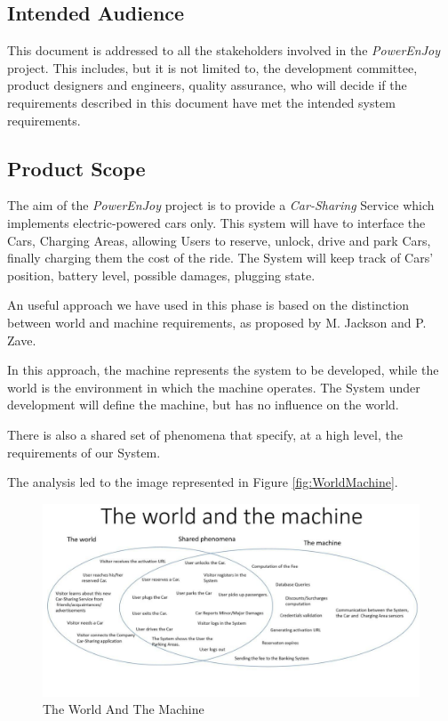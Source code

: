 \subsection{Intended Audience}
This document is addressed to all the stakeholders involved in the \emph{PowerEnJoy} project. This includes, but it is not limited to, the development committee, product designers and engineers, quality assurance, who will decide if the requirements described in this document have met the intended system requirements.

\subsection{Product Scope}
The aim of the \emph{PowerEnJoy} project is to provide a \textit{Car-Sharing} Service which implements electric-powered cars only.
This system will have to interface the Cars, Charging Areas, allowing Users to reserve, unlock, drive and park Cars, finally charging them the cost of the ride. 
The System will keep track of Cars' position, battery level, possible damages, plugging state.

An useful approach we have used in this phase is based on the distinction between world and machine requirements, as proposed by M. Jackson and P. Zave.

In this approach, the machine represents the system to be developed, while the world is the environment in which the machine operates.
The System under development will define the machine, but has no influence on the world.

There is also a shared set of phenomena that specify, at a high level, the requirements of our System.

The analysis led to the image represented in Figure \ref{fig:WorldMachine}.
\begin{figure}[!htbp]
\centering
\includegraphics[width=\linewidth,keepaspectratio]{../The_world_and_the_machine.jpg}
\caption{The World And The Machine}
\end{figure}
\label{fig:WorldMachine}
\FloatBarrier

